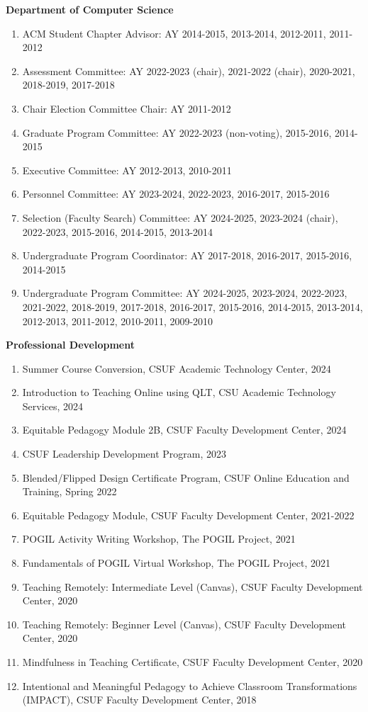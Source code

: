 \documentclass[11pt]{letter}
\begin{document}
\textbf{Department of Computer Science}
\begin{enumerate}
\item ACM Student Chapter Advisor: AY 2014-2015, 2013-2014, 2012-2011, 2011-2012
\item Assessment Committee: AY 2022-2023 (chair), 2021-2022 (chair), 2020-2021, 2018-2019, 2017-2018
\item Chair Election Committee Chair: AY 2011-2012
\item Graduate Program Committee: AY 2022-2023 (non-voting), 2015-2016, 2014-2015
\item Executive Committee: AY 2012-2013, 2010-2011
\item Personnel Committee: AY 2023-2024, 2022-2023, 2016-2017, 2015-2016
\item Selection (Faculty Search) Committee: AY 2024-2025, 2023-2024 (chair), 2022-2023, 2015-2016, 2014-2015, 2013-2014
\item Undergraduate Program Coordinator: AY 2017-2018, 2016-2017, 2015-2016, 2014-2015
\item Undergraduate Program Committee: AY 2024-2025, 2023-2024, 2022-2023, 2021-2022, 2018-2019, 2017-2018, 2016-2017, 2015-2016, 2014-2015, 2013-2014, 2012-2013, 2011-2012, 2010-2011, 2009-2010
\end{enumerate}

\textbf{Professional Development}
\begin{enumerate}
  \item Summer Course Conversion, CSUF Academic Technology Center, 2024
  \item Introduction to Teaching Online using QLT, CSU Academic Technology Services, 2024
  \item Equitable Pedagogy Module 2B, CSUF Faculty Development Center, 2024
  \item CSUF Leadership Development Program, 2023
  \item Blended/Flipped Design Certificate Program, CSUF Online Education and Training, Spring 2022
  \item Equitable Pedagogy Module, CSUF Faculty Development Center, 2021-2022
  \item POGIL Activity Writing Workshop, The POGIL Project, 2021
  \item Fundamentals of POGIL Virtual Workshop, The POGIL Project, 2021
  \item Teaching Remotely: Intermediate Level (Canvas), CSUF Faculty Development Center, 2020
  \item Teaching Remotely: Beginner Level (Canvas), CSUF Faculty Development Center, 2020
  \item Mindfulness in Teaching Certificate, CSUF Faculty Development Center, 2020
  \item Intentional and Meaningful Pedagogy to Achieve Classroom Transformations (IMPACT), CSUF Faculty Development Center, 2018
\end{enumerate}
\end{document}
